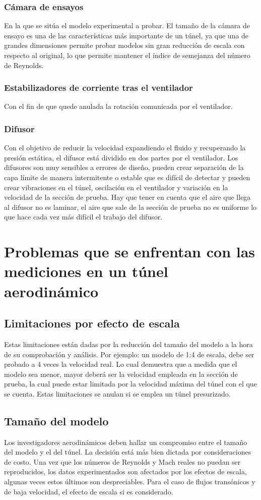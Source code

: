 \documentclass[10pt,a4paper]{article}
\begin{document}
\subsubsection{Cámara de ensayos}
En la que se sitúa el modelo experimental a probar. El tamaño de la cámara de ensayo es una de las características más importante de un túnel, ya que una de grandes dimensiones permite probar modelos sin gran reducción de escala con respecto al original, lo que permite mantener el índice de semejanza del número de Reynolds.
\subsubsection{Estabilizadores de corriente tras el ventilador}
Con el fin de que quede anulada la rotación comunicada por el ventilador.
\subsubsection{Difusor}
Con el objetivo de reducir la velocidad expandiendo el fluido y recuperando la presión estática, el difusor está dividido en dos partes por el ventilador. Los difusores son muy sensibles a errores de diseño, pueden crear separación de la capa límite de manera intermitente o estable que es difícil de detectar y pueden crear vibraciones en el túnel, oscilación en el ventilador y variación en la velocidad de la sección de prueba. Hay que tener en cuenta que el aire que llega al difusor no es laminar, el aire que sale de la sección de prueba no es uniforme lo que hace cada vez más difícil el trabajo del difusor.
\section{Problemas que se enfrentan con las mediciones en un túnel aerodinámico}
\subsection{Limitaciones por efecto de escala}
Estas limitaciones están dadas por la reducción del tamaño del modelo a la hora de su comprobación y análisis. Por ejemplo: un modelo de 1:4 de escala, debe ser probado a 4 veces la velocidad real. Lo cual demuestra que a medida que el modelo sea menor, mayor deberá ser la velocidad empleada en la sección de prueba, la cual puede estar limitada por la velocidad máxima del túnel con el que se cuenta. Estas limitaciones se anulan si se emplea un túnel presurizado.
\subsection{Tamaño del modelo}
Los investigadores aerodinámicos deben hallar un compromiso entre el tamaño del modelo y el del túnel. La decisión está más bien dictada por consideraciones de costo. Una vez que los números de Reynolds y Mach reales no puedan ser reproducidos, los datos experimentados son afectados por los efectos de escala, algunas veces estos últimos son despreciables. Para el caso de flujos transónicos y de baja velocidad, el efecto de escala si es considerado.
\end{document}
